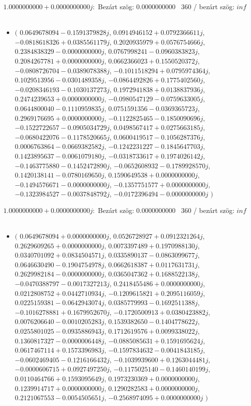 \documentclass[14pt,a4paper]{article}
\begin{document}
$1.0000000000+0.0000000000j$:\
Bezárt szög: $0.0000000000$ \
360 / bezárt szög: $inf$\
\begin{itemize}
\item
$\big($
$0.0649678094-0.1591379828j$, $0.0914946152+0.0792366611j$, $-0.0818618326+0.0385561179j$, $0.2020935979+0.0576754666j$, $0.2384838329-0.0000000000j$, $0.0767998241-0.0960383823j$, $0.2084267781+0.0000000000j$, $0.0662366023+0.1550520372j$, $-0.0808726704-0.0389078388j$, $-0.1011518294+0.0795974364j$, $0.1029513956-0.0301489358j$, $-0.0864492826+0.1775402560j$, $-0.0208346193-0.1030137273j$, $0.1972941838+0.0138837936j$, $0.2474239653+0.0000000000j$, $-0.0980547129-0.0759633005j$, $0.0644800040-0.1110959835j$, $0.0751591356-0.0369365723j$, $0.2969176695+0.0000000000j$, $-0.1122825465-0.1850090696j$, $-0.1522722657-0.0905034729j$, $0.0498567417+0.0275663185j$, $-0.0680422076-0.1178520665j$, $0.0600419517-0.1056287376j$, $0.0006763864-0.0669382582j$, $-0.1242231227-0.1845647703j$, $0.1423895637-0.0061079180j$, $-0.0318733617+0.1974026142j$, $-0.1463775880-0.1452472890j$, $-0.0652608932-0.1789928570j$, $0.1420138141-0.0780169650j$, $0.1590649538+0.0000000000j$, $-0.1494576671-0.0000000000j$, $-0.1357751577+0.0000000000j$, $-0.1323984527-0.0037848792j$, $-0.0172396494-0.0000000000j$
$\big)$
\end{itemize}
$1.0000000000+0.0000000000j$:\
Bezárt szög: $0.0000000000$ \
360 / bezárt szög: $inf$\
\begin{itemize}
\item
$\big($
$0.0649678094+0.0000000000j$, $0.0526728927+0.0912321264j$, $0.2629609265+0.0000000000j$, $0.0073397489+0.1970988130j$, $0.0340701092+0.0834504571j$, $0.0335890137-0.0863099677j$, $0.0646630490-0.1904754978j$, $0.0662618387+0.0117631731j$, $0.2629982184-0.0000000000j$, $0.0365047362+0.1688522138j$, $-0.0470388797-0.0017327213j$, $0.2418455486+0.0000000000j$, $0.0212808752+0.0442710934j$, $-0.1209615821+0.2095116059j$, $0.0225159381-0.0642943074j$, $0.0385779993-0.1692511388j$, $-0.1016278881+0.1679952670j$, $-0.1720500913+0.0380423882j$, $0.0076206640-0.0010205283j$, $0.1539382650-0.1404778622j$, $0.0255801025-0.0935886943j$, $0.1712619576+0.0099338022j$, $0.1360817327-0.0000006448j$, $-0.0885085631+0.1591695624j$, $0.0617467114+0.1573396983j$, $-0.1597834632-0.0041843185j$, $-0.0602469405-0.1216166432j$, $-0.1039939600+0.1263044481j$, $-0.0000606715+0.0927497250j$, $-0.1175025140-0.1460140199j$, $0.0110464766+0.1593095649j$, $0.1973230369+0.0000000000j$, $0.1239914717+0.0000000000j$, $0.1290282583+0.0000000000j$, $0.2121067553-0.0054505651j$, $-0.2568974095+0.0000000000j$
$\big)$
\end{itemize}
\end{document}
